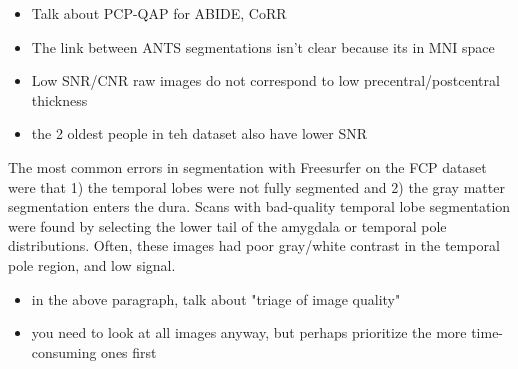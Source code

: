 \begin{itemize}
\item Talk about PCP-QAP for ABIDE, CoRR
\item The link between ANTS segmentations isn't clear because its in MNI space
\item Low SNR/CNR raw images do not correspond to low precentral/postcentral thickness
\item the 2 oldest people in teh dataset also have lower SNR
\end{itemize}


The most common errors in segmentation with Freesurfer on the FCP dataset were that 1) the temporal lobes were not fully segmented and 2) the gray matter segmentation enters the dura. Scans with bad-quality temporal lobe segmentation were found by selecting the lower tail of the amygdala or temporal pole distributions. Often, these images had poor gray/white contrast in the temporal pole region, and low signal. 

\begin{itemize}
\item in the above paragraph, talk about "triage of image quality" 
\item you need to look at all images anyway, but perhaps prioritize the more time-consuming ones first
\end{itemize}




